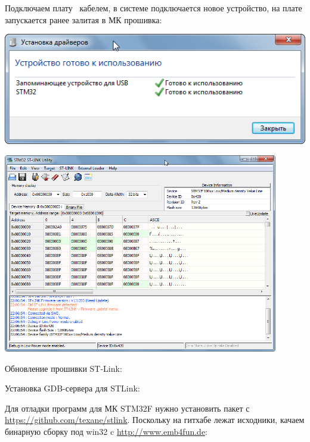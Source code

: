 \bigskip
Подключаем плату \vld\ кабелем, в системе подключается новое устройство,
на плате запускается ранее залитая в МК прошивка:

\includegraphics[height=0.3\textheight]{fig/stdrvok.png}

\bigskip
{}

\includegraphics[width=0.9\textwidth]{fig/stconnected.png}

\bigskip
Обновление прошивки ST-Link:



\bigskip
Установка GDB-сервера для STLink:

\bigskip
Для отладки программ для МК STM32F нужно установить
пакет с \url{https://github.com/texane/stlink}.  
Поскольку на гитхабе лежат исходники, качаем бинарную сборку под win32
c \url{http://www.emb4fun.de}:

\bigskip
{}

